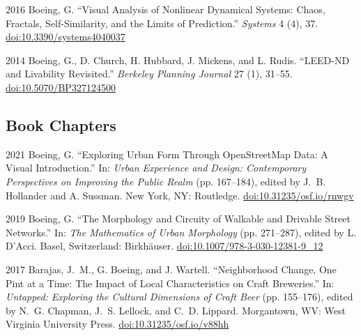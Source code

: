 \documentclass[12pt,letterpaper]{report}
\begin{document}
\begin{tablist}
        \item[2016] \tab Boeing, G. \enquote{Visual Analysis of Nonlinear Dynamical Systems: Chaos, Fractals, Self-Similarity, and the Limits of Prediction.} \textit{Systems} 4 (4), 37. \href{https://doi.org/10.3390/systems4040037}{doi:10.3390/systems4040037}

        \item[2014] \tab Boeing, G., D. Church, H. Hubbard, J. Mickens, and L. Rudis. \enquote{LEED-ND and Livability Revisited.} \textit{Berkeley Planning Journal} 27 (1), 31--55. \href{https://doi.org/10.5070/BP327124500}{doi:10.5070/BP327124500}

    \end{tablist}



    \subsection*{Book Chapters}

    \begin{tablist}

        \item[2021] \tab Boeing, G. \enquote{Exploring Urban Form Through OpenStreetMap Data: A Visual Introduction.} In: \textit{Urban Experience and Design: Contemporary Perspectives on Improving the Public Realm} (pp. 167--184), edited by J.~B. Hollander and A. Sussman. New York, NY: Routledge. \href{https://doi.org/10.31235/osf.io/rnwgv}{doi:10.31235/osf.io/rnwgv}

        \item[2019] \tab Boeing, G. \enquote{The Morphology and Circuity of Walkable and Drivable Street Networks.} In: \textit{The Mathematics of Urban Morphology} (pp. 271--287), edited by L. D'Acci. Basel, Switzerland: Birkhäuser. \href{https://doi.org/10.1007/978-3-030-12381-9_12}{doi:10.1007/978-3-030-12381-9\_12}

        \item[2017] \tab Barajas, J.~M., G. Boeing, and J. Wartell. \enquote{Neighborhood Change, One Pint at a Time: The Impact of Local Characteristics on Craft Breweries.} In: \textit{Untapped: Exploring the Cultural Dimensions of Craft Beer} (pp. 155--176), edited by N.~G. Chapman, J.~S. Lellock, and C.~D. Lippard. Morgantown, WV: West Virginia University Press. \href{https://doi.org/10.31235/osf.io/v88hh}{doi:10.31235/osf.io/v88hh}

    \end{tablist}
\end{document}
